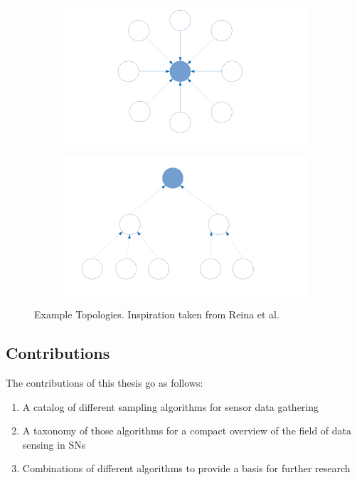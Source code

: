 \begin{figure}
\begin{subfigure}{.5\textwidth}
  \centering
  \includegraphics[width=.8\linewidth]{images/star-structure.pdf}
  \caption{}
  \label{fig:Star Topology}
\end{subfigure}%
\begin{subfigure}{.5\textwidth}
  \centering
  \includegraphics[width=.8\linewidth]{images/tree-structure.pdf}
  \caption{}
  \label{fig:Tree Topology}
\end{subfigure}
\caption{Example Topologies. Inspiration taken from Reina et al.~\cite{reina2013role}}
\label{fig:fig}
\end{figure}

\FloatBarrier


\subsection{Contributions}
\label{sec:contributions}

The contributions of this thesis go as follows: 
\begin{enumerate}
	\item A catalog of different sampling algorithms for sensor data gathering
	\item A taxonomy of those algorithms for a compact overview of the field of data sensing in \acp{SN}
	\item Combinations of different algorithms to provide a basis for further
	research
\end{enumerate}



